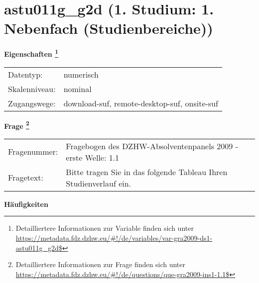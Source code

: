 
    \setcounter{footnote}{0}

    \vspace*{-1.8cm}
	\section{astu011g\_g2d (1. Studium: 1. Nebenfach (Studienbereiche))}
	\label{section:astu011g_g2d}



    \vspace*{0.5cm}
    \noindent\textbf{Eigenschaften
	\footnote{Detailliertere Informationen zur Variable finden sich unter
		\url{https://metadata.fdz.dzhw.eu/\#!/de/variables/var-gra2009-ds1-astu011g_g2d$}}}\\
	\begin{tabularx}{\hsize}{@{}lX}
	Datentyp: & numerisch \\
	Skalenniveau: & nominal \\
	Zugangswege: &
	  download-suf, 
	  remote-desktop-suf, 
	  onsite-suf
 \\
    \end{tabularx}



				\vspace*{0.5cm}
                \noindent\textbf{Frage
	                \footnote{Detailliertere Informationen zur Frage finden sich unter
		              \url{https://metadata.fdz.dzhw.eu/\#!/de/questions/que-gra2009-ins1-1.1$}}}\\
				\begin{tabularx}{\hsize}{@{}lX}
					Fragenummer: &
					  Fragebogen des DZHW-Absolventenpanels 2009 - erste Welle:
					  1.1
 \\
					Fragetext: & Bitte tragen Sie in das folgende Tableau Ihren Studienverlauf ein. \\
				\end{tabularx}





        		\vspace*{0.5cm}
                \noindent\textbf{Häufigkeiten}

